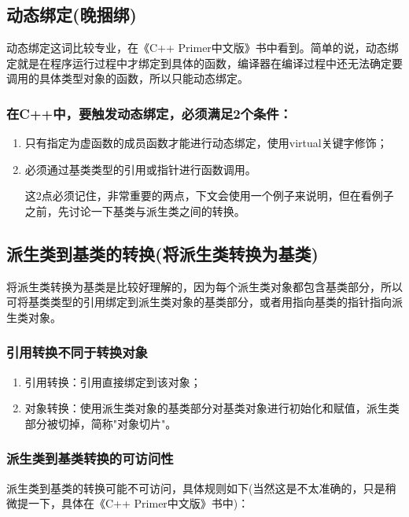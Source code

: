 \documentclass{article}
\begin{document}
\subsection{动态绑定(晚捆绑)}
\label{sec-8-2}
动态绑定这词比较专业，在《C++ Primer中文版》书中看到。简单的说，动态绑定就是在程序运行过程中才绑定到具体的函数，编译器在编译过程中还无法确定要调用的具体类型对象的函数，所以只能动态绑定。

\subsubsection{在C++中，要触发动态绑定，必须满足2个条件：}
\label{sec-8-2-1}
\begin{enumerate}
\item 只有指定为虚函数的成员函数才能进行动态绑定，使用virtual关键字修饰；
\label{sec-8-2-1-1}
\item 必须通过基类类型的引用或指针进行函数调用。
\label{sec-8-2-1-2}

这2点必须记住，非常重要的两点，下文会使用一个例子来说明，但在看例子之前，先讨论一下基类与派生类之间的转换。
\end{enumerate}
\subsection{派生类到基类的转换(将派生类转换为基类)}
\label{sec-8-3}
将派生类转换为基类是比较好理解的，因为每个派生类对象都包含基类部分，所以可将基类类型的引用绑定到派生类对象的基类部分，或者用指向基类的指针指向派生类对象。

\subsubsection{引用转换不同于转换对象}
\label{sec-8-3-1}
\begin{enumerate}
\item 引用转换：引用直接绑定到该对象；
\label{sec-8-3-1-1}
\item 对象转换：使用派生类对象的基类部分对基类对象进行初始化和赋值，派生类部分被切掉，简称"对象切片"。
\label{sec-8-3-1-2}
\end{enumerate}

\subsubsection{派生类到基类转换的可访问性}
\label{sec-8-3-2}

派生类到基类的转换可能不可访问，具体规则如下(当然这是不太准确的，只是稍微提一下，具体在《C++ Primer中文版》书中)：
\end{document}
